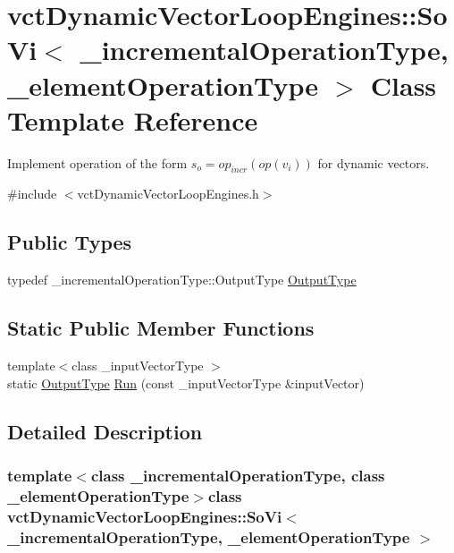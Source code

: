 \hypertarget{classvct_dynamic_vector_loop_engines_1_1_so_vi}{}\section{vct\+Dynamic\+Vector\+Loop\+Engines\+:\+:So\+Vi$<$ \+\_\+incremental\+Operation\+Type, \+\_\+element\+Operation\+Type $>$ Class Template Reference}
\label{classvct_dynamic_vector_loop_engines_1_1_so_vi}


Implement operation of the form $s_o = op_{incr}(op(v_i))$ for dynamic vectors.  




{\ttfamily \#include $<$vct\+Dynamic\+Vector\+Loop\+Engines.\+h$>$}

\subsection*{Public Types}
\begin{DoxyCompactItemize}
\item 
typedef \+\_\+incremental\+Operation\+Type\+::\+Output\+Type \hyperlink{classvct_dynamic_vector_loop_engines_1_1_so_vi_a0e42560add0a15a5c8722aee8a9aa78c}{Output\+Type}
\end{DoxyCompactItemize}
\subsection*{Static Public Member Functions}
\begin{DoxyCompactItemize}
\item 
{\footnotesize template$<$class \+\_\+input\+Vector\+Type $>$ }\\static \hyperlink{classvct_dynamic_vector_loop_engines_1_1_so_vi_a0e42560add0a15a5c8722aee8a9aa78c}{Output\+Type} \hyperlink{classvct_dynamic_vector_loop_engines_1_1_so_vi_af025608cd64ae1471ffeb1ef6f842631}{Run} (const \+\_\+input\+Vector\+Type \&input\+Vector)
\end{DoxyCompactItemize}


\subsection{Detailed Description}
\subsubsection*{template$<$class \+\_\+incremental\+Operation\+Type, class \+\_\+element\+Operation\+Type$>$class vct\+Dynamic\+Vector\+Loop\+Engines\+::\+So\+Vi$<$ \+\_\+incremental\+Operation\+Type, \+\_\+element\+Operation\+Type $>$}

